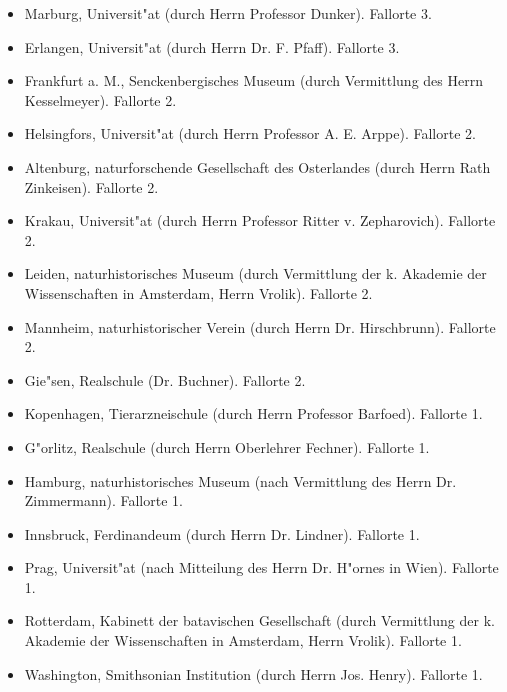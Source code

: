 \documentclass[a4paper, 11pt, oneside]{article}
\begin{document}
\begin{itemize}
    \item Marburg, Universit"at (durch Herrn Professor Dunker). Fallorte 3.

    \item Erlangen, Universit"at (durch Herrn Dr. F. Pfaff). Fallorte 3.

    \item Frankfurt a. M., Senckenbergisches Museum (durch Vermittlung des Herrn Kesselmeyer). Fallorte 2.

    \item Helsingfors, Universit"at (durch Herrn Professor A. E. Arppe). Fallorte 2.

    \item Altenburg, naturforschende Gesellschaft des Osterlandes (durch Herrn Rath Zinkeisen). Fallorte 2.

    \item Krakau, Universit"at (durch Herrn Professor Ritter v. Zepharovich). Fallorte 2.

    \item Leiden, naturhistorisches Museum (durch Vermittlung der k. Akademie der Wissenschaften in Amsterdam, Herrn Vrolik). Fallorte 2.

    \item Mannheim, naturhistorischer Verein (durch Herrn Dr. Hirschbrunn). Fallorte 2.

    \item Gie"sen, Realschule (Dr. Buchner). Fallorte 2.

    \item Kopenhagen, Tierarzneischule (durch Herrn Professor Barfoed). Fallorte 1.

    \item G"orlitz, Realschule (durch Herrn Oberlehrer Fechner). Fallorte 1.

    \item Hamburg, naturhistorisches Museum (nach Vermittlung des Herrn Dr. Zimmermann). Fallorte 1.

    \item Innsbruck, Ferdinandeum (durch Herrn Dr. Lindner). Fallorte 1.

    \item Prag, Universit"at (nach Mitteilung des Herrn Dr. H"ornes in Wien). Fallorte 1.

    \item Rotterdam, Kabinett der batavischen Gesellschaft (durch Vermittlung der k. Akademie der Wissenschaften in Amsterdam, Herrn Vrolik). Fallorte 1.

    \item Washington, Smithsonian Institution (durch Herrn Jos. Henry). Fallorte 1.
\end{itemize}
\clearpage
\end{document}
